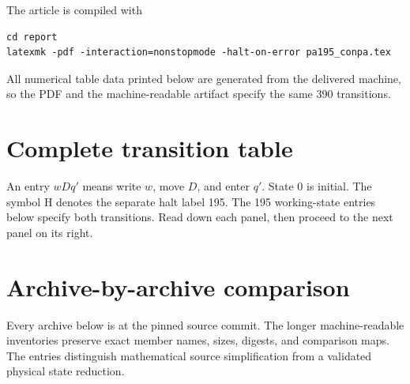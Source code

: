\documentclass[11pt,letterpaper]{article}
\begin{document}
The article is compiled with
\begin{verbatim}
cd report
latexmk -pdf -interaction=nonstopmode -halt-on-error pa195_conpa.tex
\end{verbatim}
All numerical table data printed below are generated from the delivered
machine, so the PDF and the machine-readable artifact specify the same
390 transitions.

\appendix
\clearpage
\section{Complete transition table}
\label{app:table}
An entry \(wDq'\) means write \(w\), move \(D\), and enter \(q'\).
State 0 is initial. The symbol \(\mathrm H\) denotes the separate halt
label 195. The 195 working-state entries below specify both transitions.
Read down each panel, then proceed to the next panel on its right.


\section{Archive-by-archive comparison}
\label{app:archives}
Every archive below is at the pinned source commit. The longer
machine-readable inventories preserve exact member names, sizes,
digests, and comparison maps. The entries distinguish mathematical
source simplification from a validated physical state reduction.

\end{document}
